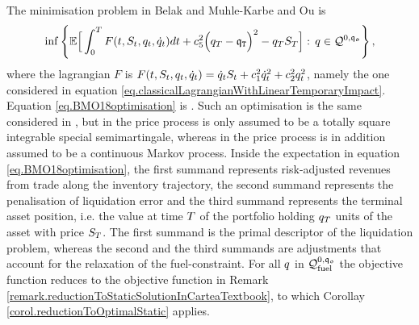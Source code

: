 \documentclass[10pt,a4paper]{article}
\begin{document}
	The minimisation problem in  Belak and Muhle-Karbe and Ou \cite{BMO18opt} is 
	\begin{equation}
	\label{eq.BMO18optimisation}
	\inf\left\lbrace
	\mathbb{{E}}\Big[
	\int_{0}^{T}F(t,S_t,q_t,\dot{q}_{t}) dt 
	+ c_{5}^{2} \Big(q_T - \mathfrak{q}_{\mathtt{T} }\Big)^{2} 
	- q_{T} S_T 
	\Big] : \, 
	q \in \mathcal{Q}^{0,\mathfrak{q_0}}
	\right\rbrace,
	\end{equation}
	where the lagrangian $F$ is $F(t,S_t,q_t,\dot{q}_{t})  = \dot{q}_{t} S_t + c_{1}^{2} \dot{q}_{t}^{2} + c_{2}^{2} q_{t}^{2}$, namely the one considered in equation \eqref{eq.classicalLagrangianWithLinearTemporaryImpact}. Equation \eqref{eq.BMO18optimisation} is \cite[Equation (2.1)]{BMO18opt}. Such an optimisation is the same considered in \cite[Equation (3.3)]{LN19inc}, but in \cite[Equation (2.1)]{BMO18opt} the price process is only assumed to be a totally square integrable special semimartingale, whereas in \cite[Equation (3.3)]{LN19inc} the price process is in addition assumed to be a continuous  Markov process. Inside the expectation in equation \eqref{eq.BMO18optimisation}, the first summand represents risk-adjusted revenues from trade along the inventory trajectory, the second summand represents the penalisation of liquidation error and the third summand represents the terminal asset position, i.e. the value at time $T$ of the portfolio holding $q_T$ units of the asset with price $S_T$. The first summand is the primal descriptor of the liquidation problem, whereas the second and the third summands are adjustments that account for the relaxation of the fuel-constraint. For all $q$ in $\mathcal{Q}_{\text{fuel}}^{0,\mathfrak{q_0}}$ the objective function reduces to the objective function in Remark \ref{remark.reductionToStaticSolutionInCarteaTextbook}, to which Corollay \ref{corol.reductionToOptimalStatic} applies. 
	
\end{document}

